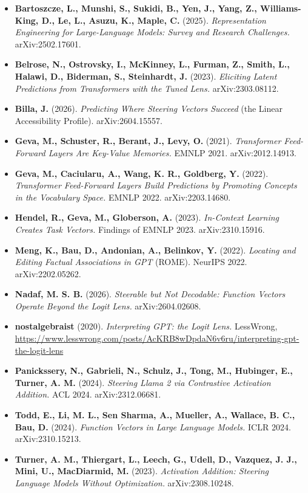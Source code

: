 \documentclass[11pt]{article}
\theoremstyle{plain}
\theoremstyle{definition}
\begin{document}
\begin{itemize}
\item \textbf{Bartoszcze, L., Munshi, S., Sukidi, B., Yen, J., Yang, Z., Williams-King, D., Le, L., Asuzu, K., Maple, C.} (2025). \emph{Representation Engineering for Large-Language Models: Survey and Research Challenges.} arXiv:2502.17601.
\item \textbf{Belrose, N., Ostrovsky, I., McKinney, L., Furman, Z., Smith, L., Halawi, D., Biderman, S., Steinhardt, J.} (2023). \emph{Eliciting Latent Predictions from Transformers with the Tuned Lens.} arXiv:2303.08112.
\item \textbf{Billa, J.} (2026). \emph{Predicting Where Steering Vectors Succeed} (the Linear Accessibility Profile). arXiv:2604.15557.
\item \textbf{Geva, M., Schuster, R., Berant, J., Levy, O.} (2021). \emph{Transformer Feed-Forward Layers Are Key-Value Memories.} EMNLP 2021. arXiv:2012.14913.
\item \textbf{Geva, M., Caciularu, A., Wang, K. R., Goldberg, Y.} (2022). \emph{Transformer Feed-Forward Layers Build Predictions by Promoting Concepts in the Vocabulary Space.} EMNLP 2022. arXiv:2203.14680.
\item \textbf{Hendel, R., Geva, M., Globerson, A.} (2023). \emph{In-Context Learning Creates Task Vectors.} Findings of EMNLP 2023. arXiv:2310.15916.
\item \textbf{Meng, K., Bau, D., Andonian, A., Belinkov, Y.} (2022). \emph{Locating and Editing Factual Associations in GPT} (ROME). NeurIPS 2022. arXiv:2202.05262.
\item \textbf{Nadaf, M. S. B.} (2026). \emph{Steerable but Not Decodable: Function Vectors Operate Beyond the Logit Lens.} arXiv:2604.02608.
\item \textbf{nostalgebraist} (2020). \emph{Interpreting GPT: the Logit Lens.} LessWrong, \url{https://www.lesswrong.com/posts/AcKRB8wDpdaN6v6ru/interpreting-gpt-the-logit-lens}
\item \textbf{Panickssery, N., Gabrieli, N., Schulz, J., Tong, M., Hubinger, E., Turner, A. M.} (2024). \emph{Steering Llama 2 via Contrastive Activation Addition.} ACL 2024. arXiv:2312.06681.
\item \textbf{Todd, E., Li, M. L., Sen Sharma, A., Mueller, A., Wallace, B. C., Bau, D.} (2024). \emph{Function Vectors in Large Language Models.} ICLR 2024. arXiv:2310.15213.
\item \textbf{Turner, A. M., Thiergart, L., Leech, G., Udell, D., Vazquez, J. J., Mini, U., MacDiarmid, M.} (2023). \emph{Activation Addition: Steering Language Models Without Optimization.} arXiv:2308.10248.

\end{itemize}
\end{document}
